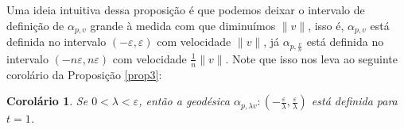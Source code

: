 \documentclass{article}
\newtheorem{definition}{Definição}
\newtheorem{proposition}{Proposição}
\newtheorem{corollary}{Corolário}
\begin{document}
Uma ideia intuitiva dessa proposição é que podemos deixar o intervalo de definição de $\alpha_{p, v}$ grande à medida com que diminuímos $\|v\|$, isso é, $\alpha_{p, v}$ está definida no intervalo $(-\varepsilon, \varepsilon)$ com velocidade $\|v\|$, já $\alpha_{p, \frac{v}{n}}$ está definida no intervalo $\left(-n\varepsilon, n\varepsilon\right)$ com velocidade $\frac{1}{n}\|v\|$. Note que isso nos leva ao seguinte corolário da Proposição \ref{prop3}:
\begin{corollary}
    \label{cor1}
    Se $0 < \lambda < \varepsilon$, então a geodésica $\alpha_{p, \lambda v} : \left(-\frac{\varepsilon}{\lambda}, \frac{\varepsilon}{\lambda}\right)$ está definida para $t = 1$.
\end{corollary}



\end{document}
